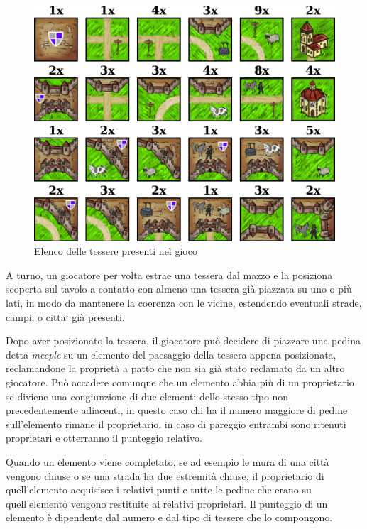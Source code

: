 \begin{figure}[H]
\centering
\includegraphics[width=\textwidth]{img/tiles.png}
\caption{Elenco delle tessere presenti nel gioco}
\label{img:tiles}
\end{figure}

A turno, un giocatore per volta estrae una tessera dal mazzo e la posiziona scoperta sul tavolo
a contatto con almeno una tessera già piazzata su uno o più lati, in modo da mantenere la coerenza con le vicine, 
estendendo eventuali strade, campi, o citta` già presenti.

Dopo aver posizionato la tessera, il giocatore può decidere di piazzare
una pedina detta \emph{meeple} su un elemento del paesaggio della tessera appena posizionata, reclamandone la proprietà a patto che non sia già stato reclamato da un altro giocatore.
Può accadere comunque che un elemento abbia più di un
proprietario se diviene una congiunzione di due elementi dello stesso
tipo non precedentemente adiacenti, in questo caso chi ha il numero maggiore di pedine sull'elemento rimane il proprietario, in caso di pareggio entrambi sono ritenuti proprietari e otterranno il punteggio relativo.

Quando un elemento viene completato, se ad esempio le mura di una città
vengono chiuse o se una strada ha due estremità chiuse, il proprietario
di quell'elemento acquisisce i relativi punti e tutte le pedine che erano su quell'elemento vengono restituite ai relativi proprietari. Il punteggio di un
elemento è dipendente dal numero e dal tipo di tessere che lo compongono.

